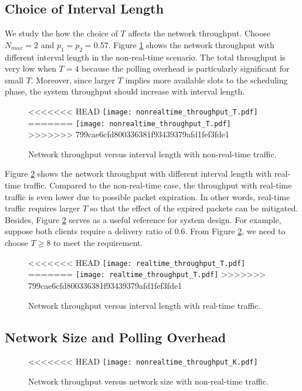 \documentclass{article}
\begin{document}
\subsection{Choice of Interval Length}
We study the how the choice of $T$ affects the network throughput. Choose $N_{max}=2$ and $p_1 = p_2 = 0.57$. Figure \ref{nonrealtime_throughput_T} shows the network throughput with different interval length in the non-real-time scenario. The total throughput is very low when $T=4$ because the polling overhead is particularly significant for small $T$. Moreover, since larger $T$ implies more available slots to the scheduling phase, the system throughput should increase with interval length. 


\begin{figure}[htbp]
\centering
<<<<<<< HEAD
\texttt{[image: nonrealtime\_throughput\_T.pdf]}
=======
\texttt{[image: nonrealtime\_throughput\_T.pdf]}
>>>>>>> 799cae6cfd800336381f93439379afd1fef3fde1
\caption{Network throughput versus interval length with non-real-time traffic.}
\label{nonrealtime_throughput_T}
\end{figure}

Figure \ref{realtime_throughput_T} shows the network throughput with different interval length with real-time traffic. Compared to the non-real-time case, the throughput with real-time traffic is even lower due to possible packet expiration. In other words, real-time traffic requires larger $T$ so that the effect of the expired packets can be mitigated. Besides, Figure \ref{realtime_throughput_T} serves as a useful reference for system design. For example, suppose both clients require a delivery ratio of 0.6. From Figure \ref{realtime_throughput_T}, we need to choose $T\geq 8$ to meet the requirement. 

\begin{figure}[htbp]
\centering
<<<<<<< HEAD
\texttt{[image: realtime\_throughput\_T.pdf]}
=======
\texttt{[image: realtime\_throughput\_T.pdf]}
>>>>>>> 799cae6cfd800336381f93439379afd1fef3fde1
\caption{Network throughput versus interval length with real-time traffic.}
\label{realtime_throughput_T}
\end{figure}

\subsection{Network Size and Polling Overhead}
\begin{figure}[htbp]
\centering
<<<<<<< HEAD
\texttt{[image: nonrealtime\_throughput\_K.pdf]}
\caption{Network throughput versus network size with non-real-time traffic.}
\label{nonrealtime_throughput_K}
\end{figure}
\end{document}
